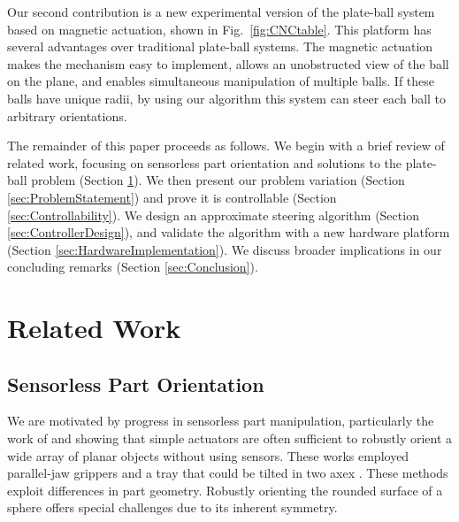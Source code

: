 \documentclass[letter paper, 10pt, conference]{ieeeconf}
\begin{document}
Our second contribution is a new experimental version of the plate-ball system based on magnetic actuation, shown in Fig.~\ref{fig:CNCtable}.  This platform has several advantages over traditional plate-ball systems.  The magnetic actuation makes the mechanism easy to implement, allows an unobstructed view of the ball on the plane, and enables simultaneous manipulation of multiple balls.  If these balls have unique radii, by using our algorithm this system can steer each ball to arbitrary orientations.

The remainder of this paper proceeds as follows. We begin with a brief review of related work, focusing on sensorless part orientation and solutions to the plate-ball problem (Section \ref{sec:RelatedWork}). We then present our problem variation (Section \ref{sec:ProblemStatement}) and prove it is controllable (Section \ref{sec:Controllability}).  We design an approximate steering algorithm (Section \ref{sec:ControllerDesign}), 
and validate the algorithm with a new hardware platform (Section \ref{sec:HardwareImplementation}).  We discuss broader implications in our concluding remarks (Section \ref{sec:Conclusion}).




\section{Related Work}\label{sec:RelatedWork}

\subsection{Sensorless Part Orientation}
We are motivated by progress in sensorless part manipulation, particularly the work of   \cite{Erdmann1988}  and \cite{Canny1994} showing that simple actuators are often sufficient to robustly orient a wide array of planar objects without using sensors.  These works employed parallel-jaw grippers  \cite{Canny1994} and a tray that could be tilted in two axex  \cite{Erdmann1988}. These methods exploit differences in part geometry. Robustly orienting the rounded surface of a sphere offers special challenges due to its inherent symmetry. 
\end{document}
